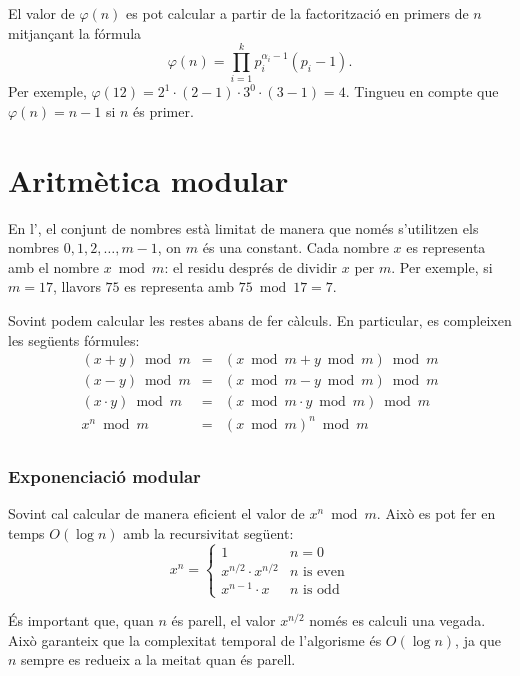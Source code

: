 El valor de $\varphi(n)$ es pot calcular a partir de la factorització
en primers de $n$ mitjançant la fórmula
\[ \varphi(n) = \prod_{i=1}^k p_i^{\alpha_i-1}(p_i-1). \]
Per exemple, $\varphi(12)=2^1 \cdot (2-1) \cdot 3^0 \cdot
(3-1)=4$. Tingueu en compte que $\varphi(n)=n-1$ si $n$ és primer.

\section{Aritmètica modular}


En l', el conjunt de nombres està limitat de
manera que només s'utilitzen els nombres $0,1,2,\ldots,m-1$, on $m$ és
una constant. Cada nombre $x$ es representa amb el nombre $x \bmod m$:
el residu després de dividir $x$ per $m$. Per exemple, si $m=17$,
llavors $75$ es representa amb $75 \bmod 17 = 7$.

Sovint podem calcular les restes abans de fer càlculs. En particular, es
compleixen les següents fórmules:
\[
\begin{array}{rcl}
(x+y) \bmod m & = & (x \bmod m + y \bmod m) \bmod m \\
(x-y) \bmod m & = & (x \bmod m - y \bmod m) \bmod m \\
(x \cdot y) \bmod m & = & (x \bmod m \cdot y \bmod m) \bmod m \\
x^n \bmod m & = & (x \bmod m)^n \bmod m \\
\end{array}
\]


\subsubsection{Exponenciació modular}

Sovint cal calcular de manera eficient el valor de $x^n \bmod m$. Això
es pot fer en temps $O(\log n)$ amb la recursivitat següent:
\begin{equation*}
    x^n = \begin{cases}
               1        & n = 0\\
               x^{n/2} \cdot x^{n/2} & \text{$n$ is even}\\
               x^{n-1} \cdot x & \text{$n$ is odd}
           \end{cases}
\end{equation*}


És important que, quan $n$ és parell, el valor $x^{n/2}$ només es
calculi una vegada. Això garanteix que la complexitat temporal de
l'algorisme és $O(\log n)$, ja que $n$ sempre es redueix a la meitat
quan és parell.


